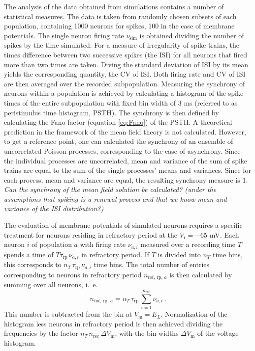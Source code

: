 The analysis of the data obtained from simulations contains a number of 
statistical measures. The data is taken from randomly chosen subsets of each population, 
containing 1000 neurons for spikes, 100 in the case of membrane potentials. 
The single neuron firing rate $\nu_\text{sim}$ is 
obtained dividing the number of spikes by the time simulated. 
For a measure of irregularity of spike trains, the times difference
between two successive spikes (the ISI) for all neurons that fired more than two times 
are taken. Diving the standard deviation of ISI by its mean
yields the corresponding quantity, the CV of ISI. Both firing rate and CV of ISI 
are then averaged over the recorded subpopulation. 
Measuring the synchrony of neurons within a population is achieved by 
calculating a histogram of the spike times of the entire subpopulation
with fixed bin width of $3$ ms (referred to as peristimulus time histogram, PSTH).
The synchrony is then defined by calculating the Fano factor (equation
\eqref{eq:Fano}) of the PSTH.
A theoretical prediction in the framework of the mean field theory is not calculated. 
However, to get a reference point, one can calculated the synchrony of an ensemble 
of uncorrelated Poisson processes, corresponding to the case of asynchrony. 
Since the individual processes are uncorrelated, mean and variance of the sum of 
spike trains are equal to the sum of the single processes' means and variances. 
Since for each process, mean and variance are equal, the resulting synchrony measure is 1. 
\emph{Can the synchrony of the mean field solution be calculated? (under the assumptions
that spiking is a renewal process and that we know mean and variance of the ISI distribution?)}

The evaluation of membrane potentials of simulated neurons requires a specific treatment 
for neurons residing in refractory period at the $V_\text{r} = -65$ mV. 
Each neuron $i$ of population $a$ with firing rate $\nu_{a, i}$ measured over 
a recording time $T$ spends a time of \:$T \tau_\text{rp} \,\nu_{a, i}$\: in refractory 
period. If $T$ is divided into $n_T$ time bins, this corresponds to 
$n_T \, \tau_\text{rp} \,\nu_{a, i}$ time bins. The total number of entries 
corresponding to neurons in refractory period $n_{tot, \,\text{rp}, \,a}$ is then 
calculated by summing over all neurons, i.~e.
\begin{equation}
    n_{tot, \,\text{rp}, \,a}
        = n_T \, \tau_\text{rp} \,\sum_{i = 1}^{n_\text{rec}}\nu_{a, i} \, .
    \label{eq:n_tot_rp}
\end{equation}
This number is subtracted from the bin at $V_\text{m} = E_L$. Normalization 
of the histogram less neurons in refractory period is then
achieved dividing the frequencies by the factor $n_T \, n_\text{rec} \, \Delta V_\text{m}$, 
with the bin widths $\Delta V_\text{m}$ of the voltage histogram.

